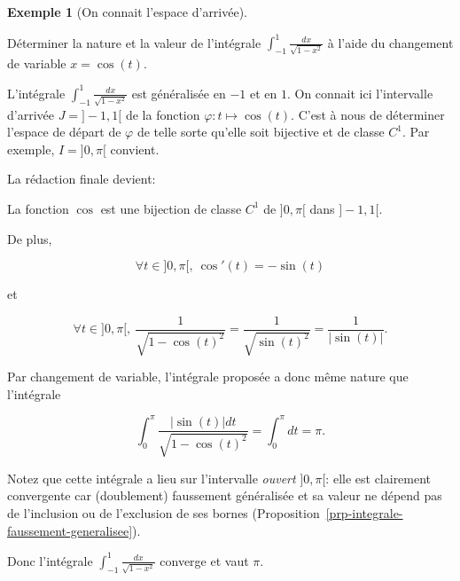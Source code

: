 \documentclass[
  french,
  letterpaper,
  DIV=11,
  numbers=noendperiod]{scrreprt}
\theoremstyle{plain}
\theoremstyle{definition}
\theoremstyle{plain}
\theoremstyle{plain}
\theoremstyle{definition}
\theoremstyle{definition}
\newtheorem{example}{Exemple}[chapter]
\theoremstyle{plain}
\theoremstyle{remark}
\begin{document}
\begin{example}[On connait l'espace
d'arrivée]\protect\hypertarget{exm-espace-arrivee}{}\label{exm-espace-arrivee}

Déterminer la nature et la valeur de l'intégrale
\(\int_{-1}^{1}\frac{dx}{\sqrt{1-x^{2}}}\) à l'aide du changement de
variable \(x=\cos(t)\).

L'intégrale \(\int_{-1}^{1}\frac{dx}{\sqrt{1-x^{2}}}\) est généralisée
en \(-1\) et en \(1\). On connait ici l'intervalle d'arrivée
\(J=]-1,1[\) de la fonction \(\varphi:t \mapsto \cos(t)\). C'est à nous
de déterminer l'espace de départ de \(\varphi\) de telle sorte qu'elle
soit bijective et de classe \(C^{1}\). Par exemple, \(I=]0,\pi[\)
convient.

La rédaction finale devient:

La fonction \(\cos\) est une bijection de classe \(C^{1}\) de
\(]0,\pi[\) dans \(]-1,1[\).

De plus,

\[
    \forall t \in ]0,\pi[,\ \cos'(t) = -\sin(t) 
\]

et

\[
  \forall t \in ]0,\pi[,\ \frac{1}{\sqrt{1- \cos(t)^{2}}}=
\frac{1}{\sqrt{\sin(t)^{2}}}=\frac{1}{|\sin(t)|}.   
\]

Par changement de variable, l'intégrale proposée a donc même nature que
l'intégrale

\[
    \int_{0}^{\pi}\frac{|\sin(t)|dt}{\sqrt{1-\cos(t)^{2}}}=\int_{0}^{\pi}dt=\pi.
\]

Notez que cette intégrale a lieu sur l'intervalle \emph{ouvert}
\(]0,\pi[\): elle est clairement convergente car (doublement) faussement
généralisée et sa valeur ne dépend pas de l'inclusion ou de l'exclusion
de ses bornes (Proposition~\ref{prp-integrale-faussement-generalisee}).

Donc l'intégrale \(\int_{-1}^{1}\frac{dx}{\sqrt{1-x^{2}}}\) converge et
vaut \(\pi\).

\end{example}
\end{document}
